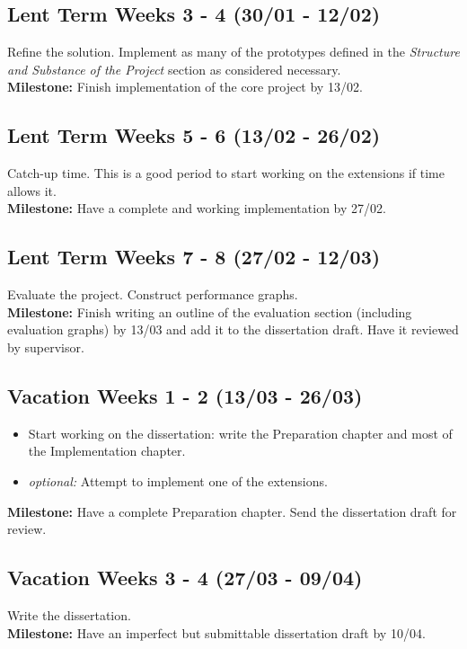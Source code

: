 \subsection*{Lent Term Weeks 3 - 4 (30/01 - 12/02)}
Refine the solution. Implement as many of the prototypes defined in the \emph{Structure and Substance of the Project} section as considered necessary.\\ 
{\bf Milestone:} Finish implementation of the core project by 13/02.

\subsection*{Lent Term Weeks 5 - 6 (13/02 - 26/02)}
Catch-up time. This is a good period to start working on the extensions if time allows it.\\
{\bf Milestone:} Have a complete and working implementation by 27/02.

\subsection*{Lent Term Weeks 7 - 8 (27/02 - 12/03)}
Evaluate the project. Construct performance graphs.\\
{\bf Milestone:} Finish writing an outline of the evaluation section (including evaluation graphs) by 13/03 and add it to the dissertation draft. Have it reviewed by supervisor.

\subsection*{Vacation Weeks 1 - 2 (13/03 - 26/03)}
\begin{itemize}
\item Start working on the dissertation: write the Preparation chapter and most of the Implementation chapter.
\item \emph{optional:} Attempt to implement one of the extensions.
\end{itemize}
{\bf Milestone:} Have a complete Preparation chapter. Send the dissertation draft for review.

\subsection*{Vacation Weeks 3 - 4 (27/03 - 09/04)}
Write the dissertation.\\
{\bf Milestone:} Have an imperfect but submittable dissertation draft by 10/04.

